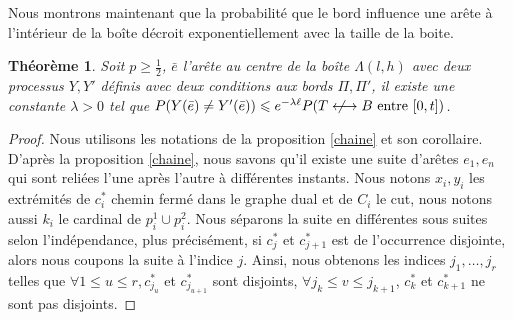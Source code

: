 \documentclass[titlepage,a4paper,12pt]{article}
\newcounter{thm}
\newcounter{prop}
\newcounter{cor}
\newtheorem{cvg}[thm]{Théorème}
\newcommand{\nlongleftrightarrow}{\longleftrightarrow \kern-15pt\not \kern15pt}
\begin{document}
Nous montrons maintenant que la probabilité que le bord influence une arête à l'intérieur de la boîte décroit exponentiellement avec la taille de la boite. 
\begin{cvg}
Soit $p\geqslant \frac{1}{2}$, $\bar{e}$ l'arête au centre de la boîte $\Lambda(l,h)$ avec deux processus $Y,Y'$ définis avec deux conditions aux bords $\Pi, \Pi'$, il existe une constante $\lambda> 0$ tel que $P(Y(\bar{e})\neq Y'(\bar{e})) \leqslant e^{-\lambda \ell} P(T\nlongleftrightarrow B \text{ entre }[0,t])$.
\end{cvg}

\begin{proof}

Nous utilisons les notations de la proposition \ref{chaine} et son corollaire.
D'après la proposition \ref{chaine}, nous savons qu'il existe une suite d'arêtes $e_1,e_n$ qui sont reliées l'une après l'autre à différentes instants. Nous notons $x_i,y_i$ les extrémités de $c_i^*$ chemin fermé dans le graphe dual et de $C_i$ le cut, nous notons aussi $k_i$ le cardinal de $p_i^1\cup p_i^2$. Nous séparons la suite en différentes sous suites selon l'indépendance, plus précisément, si $c^*_j$ et $c^*_{j+1}$  est de l'occurrence disjointe, alors nous coupons la suite à l'indice $j$. Ainsi, nous obtenons les indices $j_1,\dots,j_r$ telles que $\forall 1\leqslant u\leqslant r, c^*_{j_u}$ et $c^*_{j_{u+1}}$ sont disjoints, $\forall j_k \leqslant v \leqslant j_{k+1}$, $c_k^*$ et $c_{k+1}^*$ ne sont pas disjoints.


\end{proof}
\end{document}
